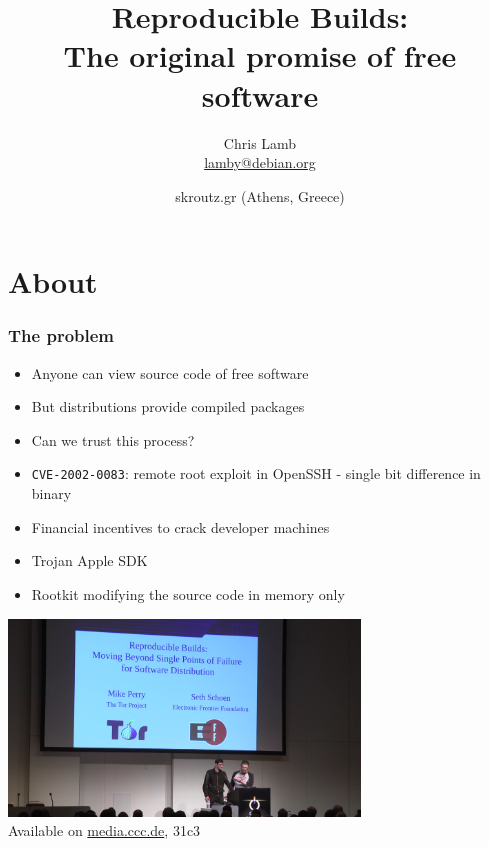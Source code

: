 \documentclass[14pt,aspectratio=169]{beamer}
\title[Reproducible Builds]{Reproducible Builds: \\ The original promise of free software}
\author[lamby]{%
   \texorpdfstring{
            \centering
            Chris Lamb \\ 
            \href{mailto:lamby@debian.org}{lamby@debian.org}
   }{lamby}}
\date[skroutz.gr '15]{%
 skroutz.gr (Athens, Greece)
}
\begin{document}
\begin{frame}
\titlepage
\end{frame}

\section{About}

\begin{frame}[fragile]
 \frametitle{The problem}
 \begin{itemize}
  \item Anyone can view source code of free software \pause
  \item But distributions provide compiled packages \pause
  \item Can we trust this process?
 \end{itemize}
\end{frame}

\begin{frame}[fragile]
 \begin{itemize}
  \item \texttt{CVE-2002-0083}: remote root exploit in OpenSSH - single bit difference in binary \pause
  \item Financial incentives to crack developer machines \pause
  \item Trojan Apple SDK \pause
  \item Rootkit modifying the source code in memory only
 \end{itemize}
\end{frame}

\begin{frame}
 \begin{center}
  \includegraphics[width=0.7\textwidth]{images/31c3.png}
  \\
  Available on \url{media.ccc.de}, 31c3
 \end{center}
\end{frame}
\end{document}
